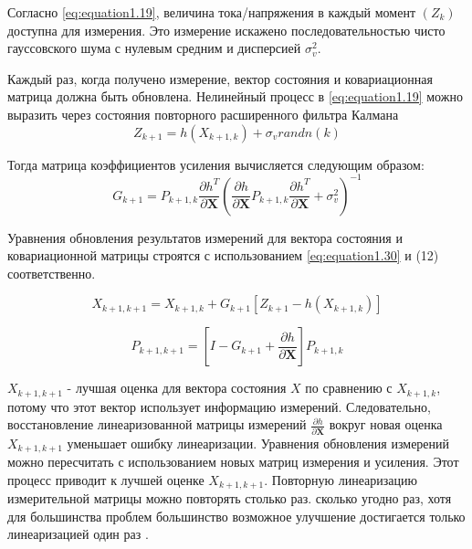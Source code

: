 Согласно \ref{eq:equation1.19}, величина тока/напряжения в каждый момент $(Z_{k})$ доступна для измерения. Это измерение искажено последовательностью чисто гауссовского шума с нулевым средним и дисперсией $ \sigma_{v}^{2}.$

Каждый раз, когда получено измерение, вектор состояния и ковариационная матрица должна быть обновлена. Нелинейный процесс в \ref{eq:equation1.19} можно выразить через состояния повторного расширенного фильтра Калмана
\begin{equation}
\label{eq:equation1.28}		
	Z_{k+1}=h(X_{k + 1,k}) + \sigma_v randn(k)
\end{equation}

Тогда матрица коэффициентов усиления вычисляется следующим образом:
\begin{equation}
	\label{eq:equation1.29}		
G_{k+1} = P_{k+1,k} \frac{{\partial h}^T}{\partial \textbf{X}} {\left( {\frac{\partial h}{\partial \textbf{X}} P_{k+1,k} \frac{{\partial h}^T}{\partial \textbf{X}} + \sigma_v^2 }\right) }^{-1}
\end{equation}

Уравнения обновления результатов измерений для вектора состояния и ковариационной матрицы строятся с использованием \ref{eq:equation1.30} и (12) соответственно.

\begin{equation}
\label{eq:equation1.30}		
X_{k+1,k+1} = X_{k+1,k} + G_{k+1}[Z_{k+1}-h(X_{k+1,k})]	
\end{equation}

\begin{equation}
	\label{eq:equation1.31}		
	P_{k+1,k+1} = \left[ {I - G_{k+1} + \frac{\partial h}{\partial \textbf{X}}} \right] P_{k+1,k}
\end{equation}

$X_{k + 1, k + 1}$ - лучшая оценка для вектора состояния $X$ по сравнению с $X_{k + 1, k}$, потому что этот вектор использует информацию измерений. Следовательно, восстановление линеаризованной матрицы измерений $\frac{\partial h}{\partial \textbf{X}}$ вокруг
новая оценка $X_{k + 1, k + 1}$ уменьшает ошибку линеаризации. Уравнения обновления измерений можно пересчитать с использованием новых матриц измерения и усиления. Этот процесс приводит к лучшей оценке $X_{k + 1, k + 1}$. Повторную линеаризацию измерительной матрицы можно повторять столько раз.
сколько угодно раз, хотя для большинства проблем большинство возможное улучшение достигается только линеаризацией один раз \cite{simon2006optimal}. 

